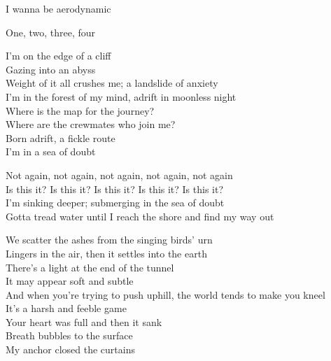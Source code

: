 
I wanna be aerodynamic\\




One, two, three, four\\


I'm on the edge of a cliff\\
Gazing into an abyss\\
Weight of it all crushes me; a landslide of anxiety\\
I'm in the forest of my mind, adrift in moonless night\\
Where is the map for the journey?\\
Where are the crewmates who join me?\\
Born adrift, a fickle route\\
I'm in a sea of doubt\\


Not again, not again, not again, not again, not again\\
Is this it? Is this it? Is this it? Is this it? Is this it?\\
I'm sinking deeper; submerging in the sea of doubt\\
Gotta tread water until I reach the shore and find my way out\\


We scatter the ashes from the singing birds' urn\\
Lingers in the air, then it settles into the earth\\
There's a light at the end of the tunnel\\
It may appear soft and subtle\\
And when you're trying to push uphill, the world tends to make you kneel\\
It's a harsh and feeble game\\
Your heart was full and then it sank\\
Breath bubbles to the surface\\
My anchor closed the curtains\\


